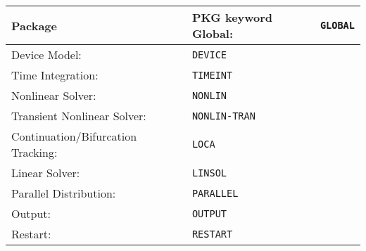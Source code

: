 

\small
\begin{longtable}[htbp]{|Y|Y|} \hline
{}\color{white}\textbf{Package} & \color{white}\bf PKG keyword \endhead
 Global:                     & \verb+GLOBAL+           \\ \hline
 Device Model:               & \verb+DEVICE+           \\ \hline
 Time Integration:           & \verb+TIMEINT+          \\ \hline
 Nonlinear Solver:           & \verb+NONLIN+           \\ \hline
 Transient Nonlinear Solver: & \verb+NONLIN-TRAN+      \\ \hline
 Continuation/Bifurcation Tracking: & \verb+LOCA+      \\ \hline
 Linear Solver:              & \verb+LINSOL+           \\ \hline
 Parallel Distribution:      & \verb+PARALLEL+         \\ \hline
 Output:                     & \verb+OUTPUT+           \\ \hline
 Restart:                    & \verb+RESTART+          \\ \hline
\end{longtable}
